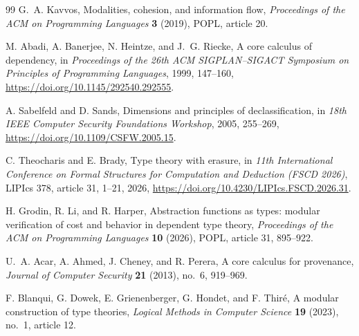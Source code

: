 \documentclass[11pt]{article}
\numberwithin{equation}{section}
\theoremstyle{definition}
\theoremstyle{plain}
\theoremstyle{remark}
\begin{document}
\begin{thebibliography}{99}
G.~A. Kavvos,
Modalities, cohesion, and information flow,
\emph{Proceedings of the ACM on Programming Languages} \textbf{3} (2019),
POPL, article 20.

M. Abadi, A. Banerjee, N. Heintze, and J.~G. Riecke,
A core calculus of dependency,
in \emph{Proceedings of the 26th ACM SIGPLAN--SIGACT Symposium on Principles
of Programming Languages}, 1999, 147--160,
\url{https://doi.org/10.1145/292540.292555}.

A. Sabelfeld and D. Sands,
Dimensions and principles of declassification,
in \emph{18th IEEE Computer Security Foundations Workshop}, 2005, 255--269,
\url{https://doi.org/10.1109/CSFW.2005.15}.

C. Theocharis and E. Brady,
Type theory with erasure,
in \emph{11th International Conference on Formal Structures for Computation
and Deduction (FSCD 2026)}, LIPIcs 378, article 31, 1--21, 2026,
\url{https://doi.org/10.4230/LIPIcs.FSCD.2026.31}.

H. Grodin, R. Li, and R. Harper,
Abstraction functions as types: modular verification of cost and behavior in
dependent type theory,
\emph{Proceedings of the ACM on Programming Languages} \textbf{10} (2026),
POPL, article 31, 895--922.

U.~A. Acar, A. Ahmed, J. Cheney, and R. Perera,
A core calculus for provenance,
\emph{Journal of Computer Security} \textbf{21} (2013), no.~6, 919--969.

F. Blanqui, G. Dowek, E. Grienenberger, G. Hondet, and F. Thir\'e,
A modular construction of type theories,
\emph{Logical Methods in Computer Science} \textbf{19} (2023), no.~1,
article 12.

\end{thebibliography}
\end{document}
